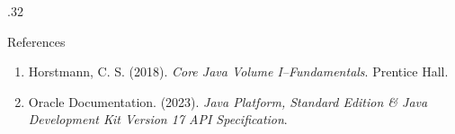 \documentclass[final]{beamer}
\begin{document}
\begin{frame}[t]
\begin{columns}[T]
\begin{column}{.32\paperwidth}
    \begin{block}{References}
      \small
      \begin{enumerate}
          \item Horstmann, C. S. (2018). \textit{Core Java Volume I--Fundamentals}. Prentice Hall.
          \item Oracle Documentation. (2023). \textit{Java Platform, Standard Edition & Java Development Kit Version 17 API Specification}.
      \end{enumerate}
    \end{block}

  \end{column}

\end{columns}
\end{frame}
\end{document}
